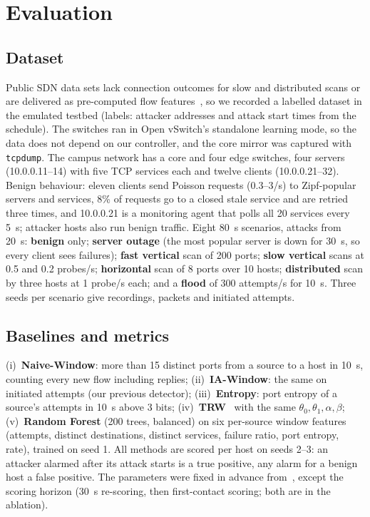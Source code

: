\documentclass[conference]{IEEEtran}
\newcommand{\cmd}[1]{\texttt{#1}}
\begin{document}
\section{Evaluation}\label{sec:eval}
\subsection{Dataset}
Public SDN data sets lack connection outcomes for slow and distributed scans or are delivered as pre-computed flow
features~\cite{sharafaldin2018cicids,elsayed2020insdn}, so we recorded a labelled dataset in the emulated testbed (labels:
attacker addresses and attack start times from the schedule). The switches ran in Open vSwitch's standalone learning mode, so
the data does not depend on our controller, and the core mirror was captured with \cmd{tcpdump}. The campus network has a
core and four edge switches, four servers (10.0.0.11--14) with five TCP services each and twelve clients (10.0.0.21--32).
Benign behaviour: eleven clients send Poisson requests (0.3--3/s) to Zipf-popular servers and services, 8\% of requests go to a
closed stale service and are retried three times, and 10.0.0.21 is a monitoring agent that polls all 20 services every 5~s;
attacker hosts also run benign traffic. Eight 80~s scenarios, attacks from 20~s: \textbf{benign} only; \textbf{server
outage} (the most popular server is down for 30~s, so every client sees failures); \textbf{fast vertical} scan of 200 ports;
\textbf{slow vertical} scans at 0.5 and 0.2 probes/s; \textbf{horizontal} scan of 8 ports over 10 hosts;
\textbf{distributed} scan by three hosts at 1 probe/s each; and a \textbf{flood} of 300 attempts/s for 10~s. Three seeds
per scenario give \NRuns{} recordings, \NPkts{} packets and \NAttempts{} initiated attempts.

\subsection{Baselines and metrics}
(i)~\textbf{Naive-Window}: more than 15 distinct ports from a source to a host in 10~s, counting every new flow including
replies; (ii)~\textbf{IA-Window}: the same on initiated attempts (our previous detector); (iii)~\textbf{Entropy}: port
entropy of a source's attempts in 10~s above 3 bits; (iv)~\textbf{TRW}~\cite{jung2004trw} with the same
$\theta_0,\theta_1,\alpha,\beta$; (v)~\textbf{Random Forest} (200 trees, balanced) on six per-source window features
(attempts, distinct destinations, distinct services, failure ratio, port entropy, rate), trained on seed 1. All methods are
scored per host on seeds 2--3: an attacker alarmed after its attack starts is a true positive, any alarm for a benign host a
false positive. The parameters were fixed in advance from~\cite{jung2004trw}, except the scoring horizon (30~s re-scoring,
then first-contact scoring; both are in the ablation).
\end{document}
